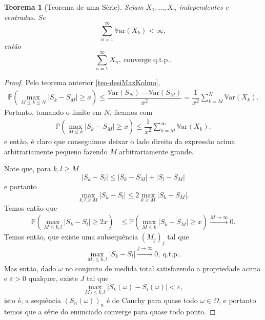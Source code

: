 \documentclass[12pt,a4paper,oneside]{book}
\newtheorem{theorem}{Teorema}[section]
\theoremstyle{definition}
\theoremstyle{remark}
\numberwithin{equation}{section}
\newcommand{\e}{\varepsilon}
\newcommand{\pr}{\mathbb{P}}
\newcommand{\Var}{\mathbb{V}\text{ar}}
\begin{document}
\begin{theorem}[Teorema de uma Série]\label{teo-1serie}
Sejam $X_1,\dots,X_n$ independentes e centradas. Se 
$$\sum_{n=1}^\infty \Var(X_k)<\infty, $$
então
$$ \sum^\infty_{n=1} X_n,\ \textrm{converge q.t.p..} $$
\end{theorem}
\begin{proof}
Pelo teorema anterior \ref{teo-desiMaxKolmo}, 
\begin{align*}
\pr\left( \max_{M\leq k\leq N} |S_k-S_M|\geq x   \right)\leq \dfrac{\Var(S_N) - \Var(S_M)}{x^2} = \dfrac{1}{x^2}\sum_{k=M}^N \Var(X_k).
\end{align*}
Portanto, tomando o limite em $N$, ficamos com
\begin{align*}
\pr\left( \max_{M\leq k} |S_k-S_M|\geq x   \right)\leq  \dfrac{1}{x^2}\sum_{k=M}^\infty \Var(X_k).
\end{align*}
e então, é claro que conseguimos deixar o lado direito da expressão acima arbitrariamente pequeno fazendo $M$ arbitrariamente grande.

Note que, para $k,l\geq M$
$$|S_k-S_l|\leq |S_k-S_M|+|S_l-S_M| $$
e portanto
$$\max_{k,l\geq M} |S_k-S_l|\leq 2\max_{k\geq M}|S_k-S_M|. $$
Temos então que
\begin{align*}
\pr\left( \max_{M\leq k,l} |S_k-S_l|\geq 2x   \right) &\leq \pr\left( \max_{M\leq k} |S_k-S_M|\geq x   \right) \overset{M\rightarrow\infty}{\longrightarrow}  0.
\end{align*}
Temos então, que existe uma subsequência $(M_j)_j$ tal que
$$\max_{M_j \leq k,l}| S_k-S_l| \overset{j\rightarrow\infty}{\longrightarrow}  0,\ \textrm{q.t.p..}  $$
Mas então, dado $\omega$ no conjunto de medida total satisfazendo a propriedade acima e $\e>0$ qualquer, existe $J$ tal que 
$$ \max_{M_J \leq k,l}| S_k(\omega)-S_l(\omega)|<\e, $$
isto é, a sequência $(S_n(\omega))_n$ é de  Cauchy para quase todo $\omega\in \Omega$, e portanto temos que a série do enunciado converge para quase todo ponto.

\end{proof}
\end{document}
